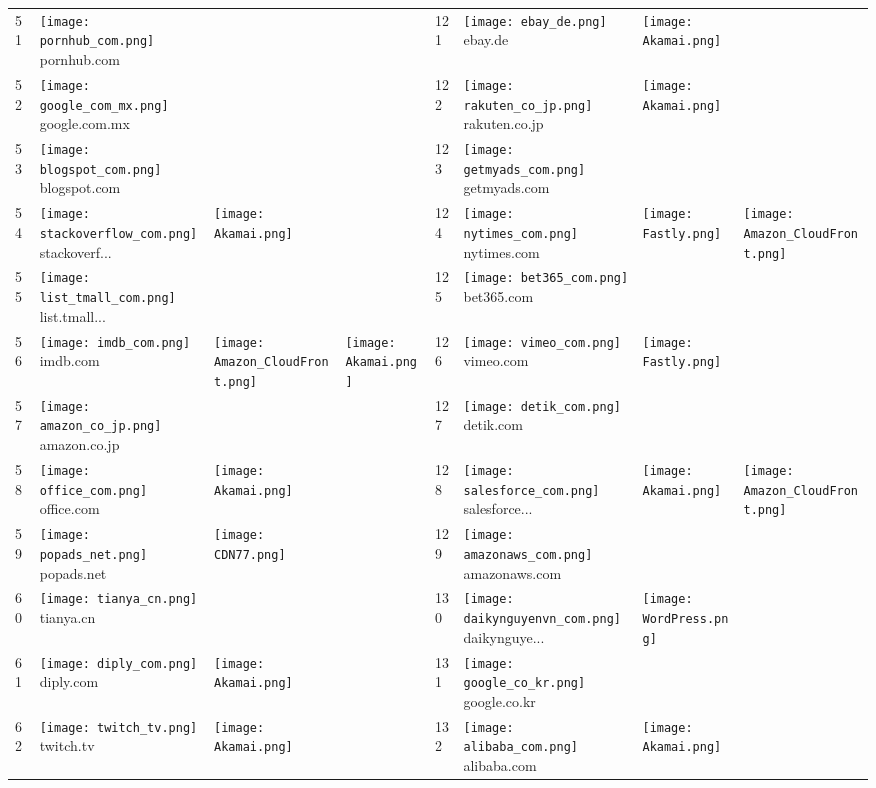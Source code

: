 \begin{table}[]
\begin{tabular}{|llll|llll|}
51 & \texttt{[image: pornhub\_com.png]} pornhub.com & & & 121 & \texttt{[image: ebay\_de.png]} ebay.de & \texttt{[image: Akamai.png]} & \\
52 & \texttt{[image: google\_com\_mx.png]} google.com.mx & & & 122 & \texttt{[image: rakuten\_co\_jp.png]} rakuten.co.jp & \texttt{[image: Akamai.png]} & \\
53 & \texttt{[image: blogspot\_com.png]} blogspot.com & & & 123 & \texttt{[image: getmyads\_com.png]} getmyads.com & & \\
54 & \texttt{[image: stackoverflow\_com.png]} stackoverf... & \texttt{[image: Akamai.png]} & & 124 & \texttt{[image: nytimes\_com.png]} nytimes.com & \texttt{[image: Fastly.png]} & \texttt{[image: Amazon\_CloudFront.png]} \\
55 & \texttt{[image: list\_tmall\_com.png]} list.tmall... & & & 125 & \texttt{[image: bet365\_com.png]} bet365.com & & \\
56 & \texttt{[image: imdb\_com.png]} imdb.com & \texttt{[image: Amazon\_CloudFront.png]} & \texttt{[image: Akamai.png]} & 126 & \texttt{[image: vimeo\_com.png]} vimeo.com & \texttt{[image: Fastly.png]} & \\
57 & \texttt{[image: amazon\_co\_jp.png]} amazon.co.jp & & & 127 & \texttt{[image: detik\_com.png]} detik.com & & \\
58 & \texttt{[image: office\_com.png]} office.com & \texttt{[image: Akamai.png]} & & 128 & \texttt{[image: salesforce\_com.png]} salesforce... & \texttt{[image: Akamai.png]} & \texttt{[image: Amazon\_CloudFront.png]} \\
59 & \texttt{[image: popads\_net.png]} popads.net & \texttt{[image: CDN77.png]} & & 129 & \texttt{[image: amazonaws\_com.png]} amazonaws.com & & \\
60 & \texttt{[image: tianya\_cn.png]} tianya.cn & & & 130 & \texttt{[image: daikynguyenvn\_com.png]} daikynguye... & \texttt{[image: WordPress.png]} & \\
61 & \texttt{[image: diply\_com.png]} diply.com & \texttt{[image: Akamai.png]} & & 131 & \texttt{[image: google\_co\_kr.png]} google.co.kr & & \\
62 & \texttt{[image: twitch\_tv.png]} twitch.tv & \texttt{[image: Akamai.png]} & & 132 & \texttt{[image: alibaba\_com.png]} alibaba.com & \texttt{[image: Akamai.png]} & \\

\end{tabular}
\end{table}
